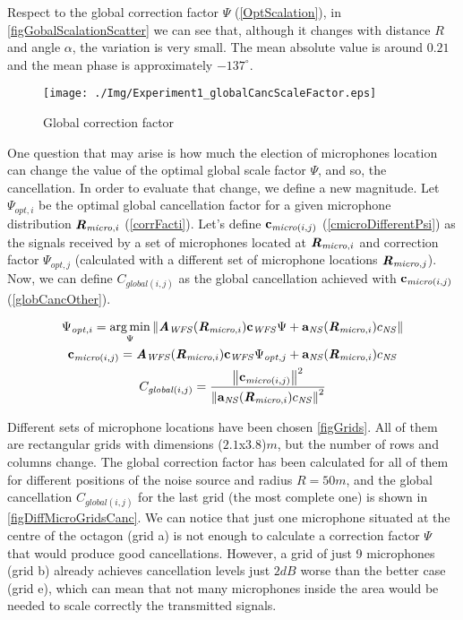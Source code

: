 Respect to the global correction factor $\Psi$ (\autoref{OptScalation}), in \autoref{figGobalScalationScatter} we can see that, although it changes with distance $R$ and angle $\alpha$, the variation is very small. The mean absolute value is around $0.21$ and the mean phase is approximately $-137^\circ$. 

\begin{figure}
	\centering
	\texttt{[image: ./Img/Experiment1\_globalCancScaleFactor.eps]}
	\caption[Global correction factor]{Global correction factor}
	\label{figGobalScalationScatter}
\end{figure}

One question that may arise is how much the election of microphones location can change the value of the optimal global scale factor $\Psi$, and so, the cancellation. In order to evaluate that change, we define a new magnitude. Let $\Psi_{\mathit{opt}, i}$ be the optimal global cancellation factor for a given microphone distribution $\pos[matMicro]{,i}$ (\autoref{corrFacti}). Let's define $\cmicro[(i,j)]$ (\autoref{cmicroDifferentPsi}) as the signals received by a set of microphones located at $\pos[matMicro]{,i}$ and correction factor $\Psi_{\mathit{opt}, j}$ (calculated with a different set of microphone locations $\pos[matMicro]{,j}$). Now, we can define $C_{\mathit{global}(i,j)}$ as the global cancellation achieved with $\cmicro[(i,j)]$ (\autoref{globCancOther}).

\begin{gather}
\Psi_{\mathit{opt}, i} = \argmin_{\Psi} \norm{\Awfs(\pos[matMicro]{,i})\cwfs \Psi + \vec{a}_{\mathit{NS}}(\pos[matMicro]{,i}) \cnsScalar} \label{corrFacti} \\
\cmicro[(i,j)] = \Awfs(\pos[matMicro]{,i})\cwfs \Psi_{\mathit{opt}, j} + \vec{a}_{\mathit{NS}}(\pos[matMicro]{,i}) \cnsScalar \label{cmicroDifferentPsi} \\
C_{\mathit{global}(i,j)} = \frac{\norm{\cmicro[(i,j)]}^2}{\norm{\vec{a}_{\mathit{NS}}(\pos[matMicro]{,i}) \cnsScalar}^2} \label{globCancOther}
\end{gather}

Different sets of microphone locations have been chosen \autoref{figGrids}. All of them are rectangular grids with dimensions ($2.1$x$3.8$)$\si{m}$, but the number of rows and columns change. The global correction factor has been calculated for all of them for different positions of the noise source and radius $R = 50\si{m}$, and the global cancellation $C_{\mathit{global}(i,j)}$ for the last grid (the most complete one) is shown in \autoref{figDiffMicroGridsCanc}. We can notice that just one microphone situated at the centre of the octagon (grid a) is not enough to calculate a correction factor $\Psi$ that would produce good cancellations. However, a grid of just 9 microphones (grid b) already achieves cancellation levels just $2\si{dB}$ worse than the better case (grid e), which can mean that not many microphones inside the area would be needed to scale correctly the transmitted signals.

